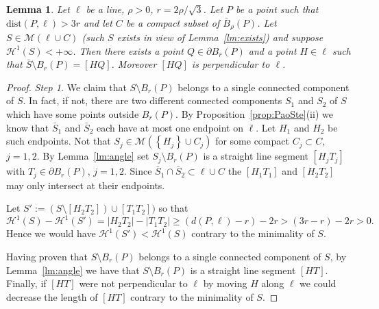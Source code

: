 \documentclass{article}
\renewcommand{\H}{\mathcal H}
\newcommand{\abs}[1]{\left\vert #1 \right\vert}
\newcommand{\ENCLOSE}[1]{\left\{#1\right\}}
\newcommand{\M}{\mathcal{M}}
\renewcommand{\H}{\mathcal{H}}
\newcommand{\dist}{\mathrm{dist}}
\newtheorem{lemma}[theorem]{Lemma}
\theoremstyle{definition}
\theoremstyle{remark}
\begin{document}
\begin{lemma}\label{lm:base}
  Let $\ell$ be a line, $\rho>0$, 
  $r=2\rho/\sqrt 3$.
  Let $P$ be a point such that $\dist(P,\ell)>3r$
  and let $C$ be a compact subset of $\bar B_\rho(P)$.
  Let $S \in \M(\ell\cup C)$ 
  (such $S$ exists in view of Lemma~\ref{lm:exists})
  and suppose $\H^1(S)<+\infty$.
  Then there exists a point $Q\in \partial B_r(P)$ 
  and a point $H\in \ell$
  such that $\bar S\setminus B_r(P) = [HQ]$.
  Moreover $[HQ]$ is perpendicular to $\ell$.
\end{lemma}
\begin{proof}
  
%

  \emph{Step 1.} 
  We claim that $S\setminus B_r(P)$ belongs to 
  a single connected component of $S$. 
  In fact, if not, there are two different connected components 
  $S_1$ and $S_2$ of $S$ which have some points outside $B_r(P)$. 
  By Proposition~\ref{prop:PaoSte}(ii) we know  
  that $\bar S_1$ and $\bar S_2$ each have 
  at most one endpoint on $\ell$.
  Let $H_1$ and $H_2$ be such endpoints.
  Not that $S_j\in \M(\ENCLOSE{H_j}\cup C_j)$ 
  for some compact $C_j\subset C$, $j=1,2$. 
  By Lemma~\ref{lm:angle} 
  set $S_j\setminus B_r(P)$ is a straight line segment $[H_j T_j]$
  with $T_j\in \partial B_r(P)$, $j=1,2$.
  Since $\bar S_1\cap \bar S_2\subset \ell\cup C$ 
  the $[H_1T_1]$ and $[H_2T_2]$ may only intersect at their endpoints.
  
  Let $S':=(S\setminus [H_2T_2])\cup[T_1T_2])$ so that 
  \[
    \H^1(S) - \H^1(S')
    = \abs{H_2 T_2} - \abs{T_1T_2}
    \ge (d(P,\ell)-r) - 2r 
    > (3r-r) - 2r > 0. 
  \]
  Hence we would have $\H^1(S')<\H^1(S)$ contrary to the minimality of $S$.

  Having proven that $S\setminus B_r(P)$ belongs to a single connected 
  component of $S$, by Lemma~\ref{lm:angle} we have that 
  $S\setminus B_r(P)$ is a straight line segment $[HT]$.
  Finally, if $[HT]$ were not perpendicular to $\ell$ by moving $H$ along $\ell$ 
  we could decrease the length of $[HT]$ contrary to the minimality 
  of $S$.
\end{proof}
  
\end{document}
